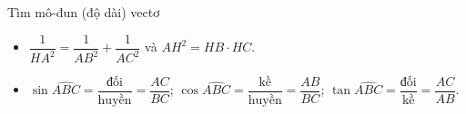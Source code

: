 \begin{dang}{Tìm mô-đun (độ dài) vectơ}
\begin{note}
{}
			\begin{itemize}
				\item $\dfrac{1}{HA^2}=\dfrac{1}{AB^2}+\dfrac{1}{AC^2}$ và $AH^2=HB\cdot HC$.
				\item $\sin\widehat {ABC}=\dfrac{\text{đối}}{\text{huyền}}=\dfrac{AC}{BC}$; \qquad
				$\cos\widehat {ABC}=\dfrac{\text{kề}}{\text{huyền}}=\dfrac{AB}{BC}$; \qquad  $\tan\widehat {ABC}=\dfrac{\text{đối}}{\text{kề}}=\dfrac{AC}{AB}$.
			\end{itemize}
		\end{note}

\end{dang}

